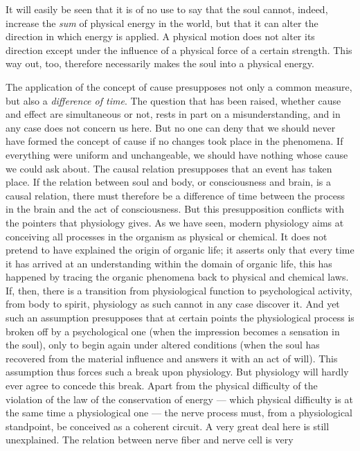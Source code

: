 \documentclass[12pt,a4paper]{book}
\newcommand{\opage}[1]{\marginnote{\footnotesize\textit{[#1]}}}
\begin{document}
It will easily be seen that it is of no use to say that the soul cannot,
indeed, increase the \emph{sum} of physical energy in the world, but
that it can alter the direction in which energy is applied. A physical
motion does not alter its direction except under the influence of a
physical force of a certain strength. This way out, too, therefore
necessarily makes the soul into a physical energy.

The application of the concept of cause presupposes not only a common
measure, but also a \emph{difference of time}. The question that has
been raised, whether cause and effect are simultaneous or not, rests in
part on a misunderstanding, and in any case does not concern us here.
But no one can deny that we should never have formed the concept of
cause if no changes took place in the phenomena. If everything were
uniform and unchangeable, we should have nothing whose cause we could
ask about. The causal relation presupposes that an event has taken
place. If the relation between soul and body, or consciousness and
brain, is a causal relation, there must therefore be a difference of
time between the process in the brain and the act of consciousness. But
this presupposition conflicts with the pointers that physiology gives.
As we have seen,
\opage{69}modern physiology aims at conceiving all processes in the
organism as physical or chemical. It does not pretend to have explained
the origin of organic life; it asserts only that every time it has
arrived at an understanding within the domain of organic life, this has
happened by tracing the organic phenomena back to physical and chemical
laws. If, then, there is a transition from physiological function to
psychological activity, from body to spirit, physiology as such cannot
in any case discover it. And yet such an assumption presupposes that at
certain points the physiological process is broken off by a
psychological one (when the impression becomes a sensation in the soul),
only to begin again under altered conditions (when the soul has
recovered from the material influence and answers it with an act of
will). This assumption thus forces such a break upon physiology. But
physiology will hardly ever agree to concede this break. Apart from the
physical difficulty of the violation of the law of the conservation of
energy --- which physical difficulty is at the same time a physiological
one --- the nerve process must, from a physiological standpoint, be
conceived as a coherent circuit. A very great deal here is still
unexplained. The relation between nerve fiber and nerve cell is very
\end{document}
